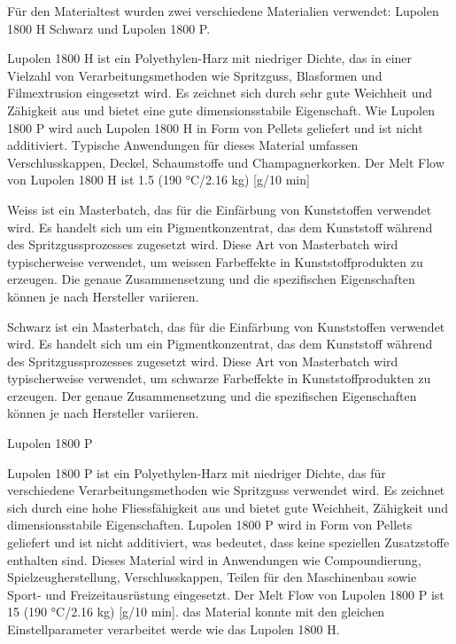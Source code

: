 Für den Materialtest wurden zwei verschiedene Materialien verwendet: Lupolen 1800 H Schwarz und Lupolen 1800 P.

Lupolen 1800 H ist ein Polyethylen-Harz mit niedriger Dichte, das in einer Vielzahl von Verarbeitungsmethoden wie Spritzguss, Blasformen und Filmextrusion eingesetzt wird. Es zeichnet sich durch sehr gute Weichheit und Zähigkeit aus und bietet eine gute dimensionsstabile Eigenschaft. Wie Lupolen 1800 P wird auch Lupolen 1800 H in Form von Pellets geliefert und ist nicht additiviert. Typische Anwendungen für dieses Material umfassen Verschlusskappen, Deckel, Schaumstoffe und Champagnerkorken. Der Melt Flow von Lupolen 1800 H ist 1.5 (190 °C/2.16 kg) [g/10 min]


Weiss ist ein Masterbatch, das für die Einfärbung von Kunststoffen verwendet wird. Es handelt sich um ein Pigmentkonzentrat, das dem Kunststoff während des Spritzgussprozesses zugesetzt wird. Diese Art von Masterbatch wird typischerweise verwendet, um weissen Farbeffekte in Kunststoffprodukten zu erzeugen. Die genaue Zusammensetzung und die spezifischen Eigenschaften können je nach Hersteller variieren.


Schwarz ist ein Masterbatch, das für die Einfärbung von Kunststoffen verwendet wird. Es handelt sich um ein Pigmentkonzentrat, das dem Kunststoff während des Spritzgussprozesses zugesetzt wird. Diese Art von Masterbatch wird typischerweise verwendet, um schwarze Farbeffekte in Kunststoffprodukten zu erzeugen. Der genaue Zusammensetzung und die spezifischen Eigenschaften können je nach Hersteller variieren.

Lupolen 1800 P

Lupolen 1800 P ist ein Polyethylen-Harz mit niedriger Dichte, das für verschiedene Verarbeitungsmethoden wie Spritzguss verwendet wird. Es zeichnet sich durch eine hohe Fliessfähigkeit aus und bietet gute Weichheit, Zähigkeit und dimensionsstabile Eigenschaften. Lupolen 1800 P wird in Form von Pellets geliefert und ist nicht additiviert, was bedeutet, dass keine speziellen Zusatzstoffe enthalten sind. Dieses Material wird in Anwendungen wie Compoundierung, Spielzeugherstellung, Verschlusskappen, Teilen für den Maschinenbau sowie Sport- und Freizeitausrüstung eingesetzt.  Der Melt Flow von Lupolen 1800 P ist 15 (190 °C/2.16 kg) [g/10 min]. das Material konnte mit den gleichen Einstellparameter verarbeitet werde wie das Lupolen 1800 H.

